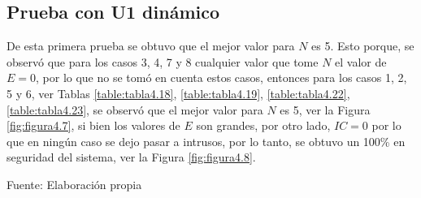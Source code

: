 \subsection{Prueba con U1 dinámico}
\par
De esta primera prueba se obtuvo que el mejor valor para $N$ es 5. Esto porque, se observó que para los casos 3, 4, 7 y 8 cualquier valor que tome $N$ el valor de $E = 0$, por lo que no se tomó en cuenta estos casos, entonces para los casos 1, 2, 5 y 6, ver Tablas \ref{table:tabla4.18}, \ref{table:tabla4.19}, \ref{table:tabla4.22}, \ref{table:tabla4.23}, se observó que el mejor valor para $N$ es 5, ver la Figura \ref{fig:figura4.7}, si bien los valores de $E$ son grandes, por otro lado, $IC = 0$ por lo que en ningún caso se dejo pasar a intrusos, por lo tanto, se obtuvo un 100\% en seguridad del sistema, ver la Figura \ref{fig:figura4.8}.

\begin{center}
\begin{table}[H]
\centering
\caption{\small{Resultados para el caso 1 con U1 dinámico.}}
\label{table:tabla4.18}
\vskip 0.2cm
\begin{center}
\vskip 0.2cm
{\small{Fuente: Elaboración propia}}
\end{center}
\end{table}
\end{center}

\vskip -1.0cm

